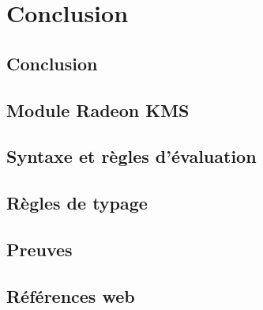\documentclass[a4paper,11pt]{memoir}
\def\partintro{}
\begin{document}
\label{cha:etudedecas}


\def\partintro{}


\part{Conclusion}

\chapter{Conclusion}

\label{cha:conclusion}


\def\partintro{}
\appendix
\renewcommand{\appendixpagename}{Annexes}
\renewcommand{\appendixtocname}{\appendixpagename}
\appendixpage*

\chapter{Module Radeon KMS}

\label{cha:code-noyau}


\chapter{Syntaxe et règles d'évaluation}
\label{anx:eval}



\chapter{Règles de typage}
\label{anx:typage}



\chapter{Preuves}



\backmatter{}


\clearpage{}

\renewcommand\listfigurename{Liste des figures}
\listoffigures{}

\clearpage{}

\renewcommand{\listtheoremname}{Liste des définitions}
\listoftheorems[ignoreall,show={definition}]

\renewcommand{\listtheoremname}{Liste des théorèmes et lemmes}
\listoftheorems[ignoreall,show={theorem,lemma}]

\chapter{Références web}

\insertlinks{}






\end{document}
